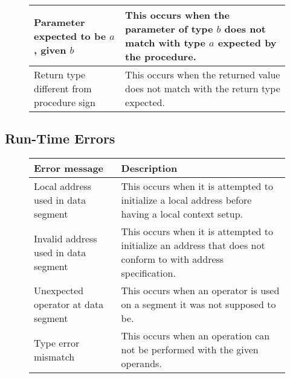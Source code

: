 \begin{figure}[h]
\begin{tabular}{p{1.5in}p{2.5in}}
        \midrule Parameter expected \newline to be $a$, given $b$ &
        This occurs when the parameter of type $b$ does not match with type $a$
        expected by the procedure.\\

        \midrule Return type \newline different from \newline procedure sign &
        This occurs when the returned value does not match with the return
        type expected.\\

        \bottomrule
    \end{tabular}
\end{figure}

\newpage

\subsection{Run-Time Errors}
\begin{figure}[h]
    \centering
    \begin{tabular}{p{1.5in}p{2.5in}}
        \toprule
        \textbf{Error message} & \textbf{Description}\\

        \midrule Local address used \newline in data segment &
        This occurs when it is attempted to initialize a local address before
        having a local context setup.\\

        \midrule Invalid address used \newline in data segment &
        This occurs when it is attempted to initialize an address that does not
        conform to with address specification.\\

        \midrule Unexpected operator \newline at data segment &
        This occurs when an operator is used on a segment it was not supposed
        to be.\\

        \midrule Type error mismatch &
        This occurs when an operation can not be performed with the given
        operands.\\

        \bottomrule
    \end{tabular}
\end{figure}

